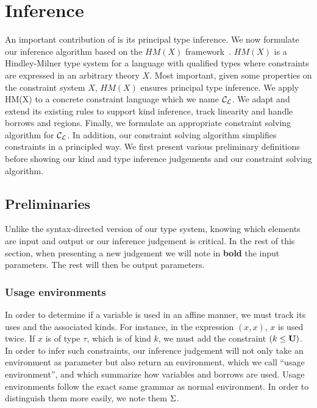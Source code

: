 \section{Inference}
\label{inference}

An important contribution of \affe is its principal type inference.
We now formulate our inference algorithm
based on the $HM(X)$ framework~\citep{DBLP:journals/tapos/OderskySW99}.
$HM(X)$ is a Hindley-Milner type system for a language
with qualified types where constraints are expressed in an arbitrary
theory $X$.
Most important, given some properties on the constraint system $X$,
$HM(X)$ ensures principal type inference.
We apply HM(X) to a concrete constraint language which we name ${\mathcal C_{\mathcal L}}$.
We adapt and extend its existing rules to support kind inference,
track linearity and handle borrows and regions. Finally, we
formulate an appropriate constraint solving algorithm for ${\mathcal C_{\mathcal L}}$.
In addition, our constraint solving algorithm simplifies constraints in a
principled way.
We first present various preliminary definitions
before showing our kind and type inference judgements
and our constraint solving algorithm.

\subsection{Preliminaries}

Unlike the syntax-directed version of our type system, knowing which elements
are input and output or our inference judgement is critical. In the rest
of this section, when presenting a new judgement
we will note in \textbf{bold} the input parameters. The rest will then be
output parameters.

\subsubsection{Usage environments}


In order to determine if a variable is used in an affine manner, we must track
its uses and the associated kinds. For instance, in the expression
$(x,x)$, $x$ is used twice. If $x$ is of type $\tau$, which is of kind $k$,
we must add the constraint $(k \leq \mathbf{U})$.
%
In order to infer such constraints, our inference judgement will not only
take an environment as parameter but also return an environment, which
we call ``usage environment'', and which summarize how variables and borrows
are used. Usage environments follow the exact same grammar
as normal environment. In order to distinguish them more easily,
we note them $\Sigma$.

